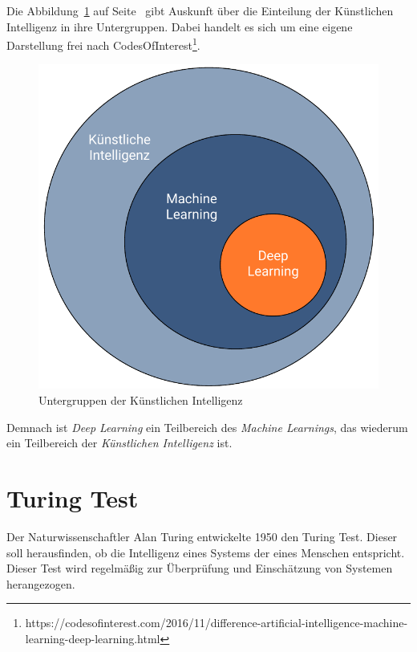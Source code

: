 Die Abbildung~\ref{fig:grundlagen_artificialintelligence} auf Seite~\pageref{fig:grundlagen_artificialintelligence} gibt
Auskunft über die Einteilung der Künstlichen Intelligenz in ihre Untergruppen. Dabei handelt es sich um eine eigene
Darstellung frei nach
CodesOfInterest\footnote{https://codesofinterest.com/2016/11/difference-artificial-intelligence-machine-learning-deep-learning.html}.

\begin{figure}[h]
    \centering
    \includegraphics[scale=0.55]{images/kapitel_2/kuenstliche_intelligenz.pdf}
    \caption{Untergruppen der Künstlichen Intelligenz}
    \label{fig:grundlagen_artificialintelligence}
\end{figure}

Demnach ist \textit{Deep Learning} ein Teilbereich des \textit{Machine Learnings}, das wiederum ein Teilbereich der
\textit{Künstlichen Intelligenz} ist.

\section{Turing Test}
Der Naturwissenschaftler Alan Turing entwickelte 1950 den Turing Test. Dieser soll herausfinden, ob die Intelligenz
eines Systems der eines Menschen entspricht. Dieser Test wird regelmäßig zur Überprüfung und Einschätzung von Systemen
herangezogen.


